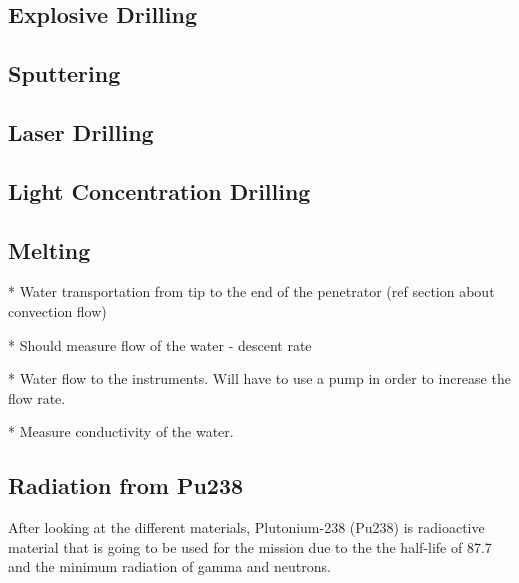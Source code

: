 \subsection{Explosive Drilling}

\subsection{Sputtering}

\subsection{Laser Drilling}

\subsection{Light Concentration Drilling}

\subsection{Melting}

* Water transportation from tip to the end of the penetrator (ref section about convection flow)

* Should measure flow of the water - descent rate

* Water flow to the instruments. Will have to use a pump in order to increase the flow rate.

* Measure conductivity of the water.


\subsection{Radiation from Pu238}
After looking at the different materials, Plutonium-238 (Pu238) is radioactive material that is going to be used for the mission due to the the half-life of 87.7 and the minimum radiation of gamma and neutrons. 

